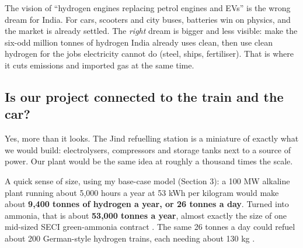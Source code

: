 \begin{verdict}
The vision of ``hydrogen engines replacing petrol engines and EVs'' is the wrong dream for India. For cars, scooters and city buses, batteries win on physics, and the market is already settled. The \emph{right} dream is bigger and less visible: make the six-odd million tonnes of hydrogen India already uses clean, then use clean hydrogen for the jobs electricity cannot do (steel, ships, fertiliser). That is where it cuts emissions and imported gas at the same time. \confH
\end{verdict}

\subsection{Is our project connected to the train and the car?}

Yes, more than it looks. The Jind refuelling station is a miniature of exactly what we would build: electrolysers, compressors and storage tanks next to a source of power. Our plant would be the same idea at roughly a thousand times the scale.

A quick sense of size, using my base-case model (Section 3): a 100 MW alkaline plant running about 5,000 hours a year at 53 kWh per kilogram would make about \textbf{9,400 tonnes of hydrogen a year, or 26 tonnes a day}. Turned into ammonia, that is about \textbf{53,000 tonnes a year}, almost exactly the size of one mid-sized SECI green-ammonia contract \cite{seci2025}. The same 26 tonnes a day could refuel about 200 German-style hydrogen trains, each needing about 130 kg \cite{barnard2026}. \confM


